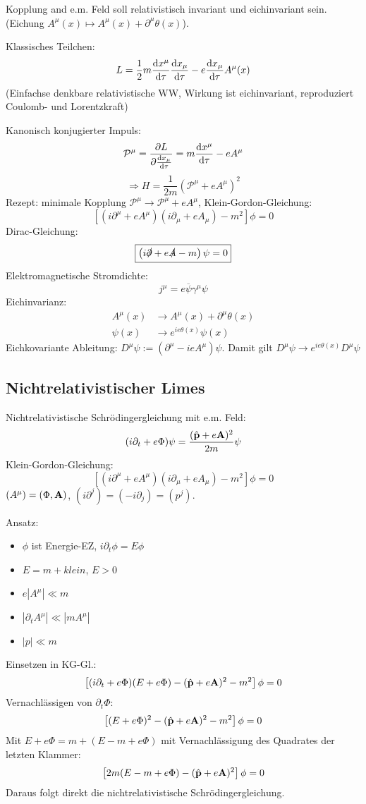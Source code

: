 \documentclass[11pt,a4paper]{report}
\begin{document}
Kopplung and e.m. Feld soll relativistisch invariant und eichinvariant sein. (Eichung $A^\mu (x)\mapsto A^\mu (x)+\partial^\mu\theta (x)$).\par 

Klassisches Teilchen:
$$L=\frac{1}{2}m\frac{\mathrm{d} x^\mu}{\mathrm{d}\tau}\frac{\mathrm{d} x_\mu}{\mathrm{d}\tau} - e\frac{\mathrm{d} x_\mu}{\mathrm{d}\tau}A^\mu (x)$$
(Einfachse denkbare relativistische WW, Wirkung ist eichinvariant, reproduziert Coulomb- und Lorentzkraft)\par 
Kanonisch konjugierter Impuls:
$$\mathcal{P}^\mu = \frac{\partial L}{\partial\frac{\mathrm{d} x_\mu}{\mathrm{d}\tau}}=m\frac{\mathrm{d} x^\mu}{\mathrm{d}\tau}-eA^\mu$$
$$\Rightarrow H=\frac{1}{2m}(\mathcal{P}^\mu + eA^\mu )^2$$
Rezept: minimale Kopplung $\mathcal{P}^\mu\rightarrow\mathcal{P}^\mu + eA^\mu$, Klein-Gordon-Gleichung:
$$\boxed{\left[\left( i\partial^\mu + eA^\mu\right)\left( i\partial_\mu +eA_\mu \right) -m^2\right]\phi = 0}$$
Dirac-Gleichung:
$$\boxed{\left(i\slashed{\partial} + e\slashed{A}-m\right)\psi = 0}$$
Elektromagnetische Stromdichte:
$$j^\mu = e\overline{\psi}\gamma^\mu\psi$$
Eichinvarianz:
\begin{align*}
A^\mu (x) &\longrightarrow A^\mu (x) +\partial^\mu\theta (x) \\
\psi (x) &\longrightarrow e^{ie\theta (x)}\psi(x)
\end{align*}
Eichkovariante Ableitung:
$D^\mu\psi :=(\partial^\mu -ieA^\mu )\psi$. Damit gilt $D^\mu\psi \longrightarrow e^{ie\theta (x)} D^\mu\psi$


\subsection{Nichtrelativistischer Limes}

Nichtrelativistische Schrödingergleichung mit e.m. Feld:
$$(i\partial_t + e\Phi )\psi = \frac{(\hat{\mathbf{p}}+e\mathbf{A})^2}{2m}\psi$$
Klein-Gordon-Gleichung:
$$\left[\left( i\partial^\mu + eA^\mu\right)\left( i\partial_\mu +eA_\mu \right) -m^2\right]\phi = 0$$
$(A^\mu ) = (\Phi ,\mathbf{A})$, $(i\partial^j) = (-i\partial_j ) = (p^j)$.\par 
Ansatz: 
\begin{itemize}
\item $\phi$ ist Energie-EZ, $i\partial_t\phi = E\phi$
\item $E=m+\textit{klein}$, $E>0$
\item $e|A^\mu |\ll m$
\item $|\partial_tA^\mu |\ll |mA^\mu |$
\item $|p|\ll m$
\end{itemize}
Einsetzen in KG-Gl.:
$$\left[ (i\partial_t+e\Phi)(E+e\Phi )-(\hat{\mathbf{p}}+e\mathbf{A})^2-m^2\right]\phi = 0$$
Vernachlässigen von $\partial_t\Phi$:
$$\left[ (E+e\Phi )^2 - (\hat{\mathbf{p}}+e\mathbf{A})^2-m^2\right]\phi = 0$$
Mit $E+e\Phi = m + (E-m+e\Phi )$ mit Vernachlässigung des Quadrates der letzten Klammer:
$$\left[ 2m(E-m+e\Phi ) - (\hat{\mathbf{p}}+e\mathbf{A})^2 \right]\phi = 0$$
Daraus folgt direkt die nichtrelativistische Schrödingergleichung.
\end{document}
